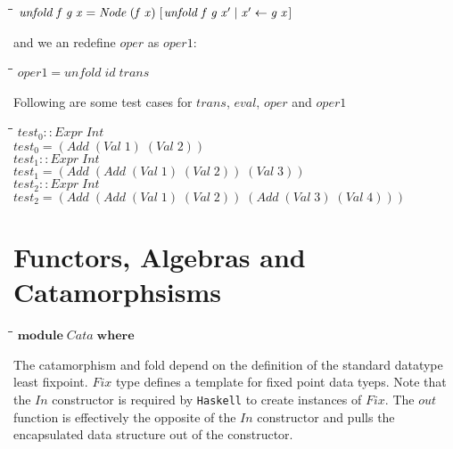 \documentclass[10pt]{article}
\newlength{\lwidth}\setlength{\lwidth}{4.5cm}
\newlength{\cwidth}\setlength{\cwidth}{8mm} %
\newcommand{\Conid}[1]{\mathit{#1}}
\newcommand{\Varid}[1]{\mathit{#1}}
\begin{document}
\begin{tabbing}
\qquad\=\hspace{\lwidth}\=\hspace{\cwidth}\=\+\kill
${\Varid{unfold}\;\Varid{f}\;\Varid{g}\;\Varid{x}\mathrel{=}\Conid{Node}\;(\Varid{f}\;\Varid{x})\;[\mskip1.5mu \Varid{unfold}\;\Varid{f}\;\Varid{g}\;\Varid{x'}\mid \Varid{x'}\leftarrow \Varid{g}\;\Varid{x}\mskip1.5mu]}$
\end{tabbing}
and we an redefine \ensuremath{\Varid{oper}} as \ensuremath{\Varid{oper1}}:

\begin{tabbing}
\qquad\=\hspace{\lwidth}\=\hspace{\cwidth}\=\+\kill
${\Varid{oper1}\mathrel{=}\Varid{unfold}\;\Varid{id}\;\Varid{trans}}$
\end{tabbing}
Following are some test cases for \ensuremath{\Varid{trans}}, \ensuremath{\Varid{eval}}, \ensuremath{\Varid{oper}} and \ensuremath{\Varid{oper1}}

\begin{tabbing}
\qquad\=\hspace{\lwidth}\=\hspace{\cwidth}\=\+\kill
${\Varid{test}_0\mathbin{::}\Conid{Expr}\;\Conid{Int}}$\\
${\Varid{test}_0\mathrel{=}(\Conid{Add}\;(\Conid{Val}\;\mathrm{1})\;(\Conid{Val}\;\mathrm{2}))}$\\
${\Varid{test}_1\mathbin{::}\Conid{Expr}\;\Conid{Int}}$\\
${\Varid{test}_1\mathrel{=}(\Conid{Add}\;(\Conid{Add}\;(\Conid{Val}\;\mathrm{1})\;(\Conid{Val}\;\mathrm{2}))\;(\Conid{Val}\;\mathrm{3}))}$\\
${\Varid{test}_2\mathbin{::}\Conid{Expr}\;\Conid{Int}}$\\
${\Varid{test}_2\mathrel{=}(\Conid{Add}\;(\Conid{Add}\;(\Conid{Val}\;\mathrm{1})\;(\Conid{Val}\;\mathrm{2}))\;(\Conid{Add}\;(\Conid{Val}\;\mathrm{3})\;(\Conid{Val}\;\mathrm{4})))}$
\end{tabbing}
\section{Functors, Algebras and Catamorphsisms}

\begin{tabbing}
\qquad\=\hspace{\lwidth}\=\hspace{\cwidth}\=\+\kill
${\mathbf{module}\;\Conid{Cata}\;\mathbf{where}}$
\end{tabbing}
The catamorphism and fold depend on the definition of the standard
datatype least fixpoint.  \ensuremath{\Conid{Fix}} type defines a template for fixed
point data tyeps.  Note that the \ensuremath{\Conid{In}} constructor is required by
\texttt{Haskell} to create instances of \ensuremath{\Conid{Fix}}.  The \ensuremath{\Varid{out}} function is
effectively the opposite of the \ensuremath{\Conid{In}} constructor and pulls the
encapsulated data structure out of the constructor.
\end{document}
